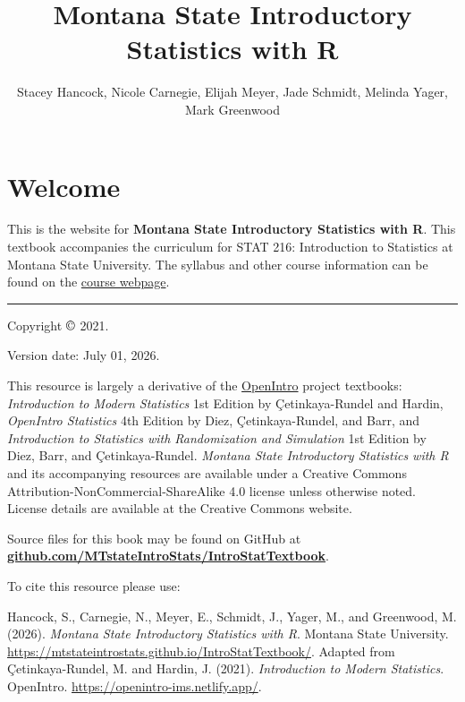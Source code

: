\documentclass[
  10pt,
  openany]{book}
\title{Montana State Introductory Statistics with R}
\author{Stacey Hancock, Nicole Carnegie, Elijah Meyer, Jade Schmidt, Melinda Yager, Mark Greenwood}
\date{}
\theoremstyle{definition}
\theoremstyle{definition}
\theoremstyle{definition}
\theoremstyle{definition}
\theoremstyle{remark}
\begin{document}
\maketitle

{
\setcounter{tocdepth}{1}
\tableofcontents
}
\chapter*{Welcome}\label{welcome}

This is the website for \textbf{Montana State Introductory Statistics with R}.
This textbook accompanies the curriculum for STAT 216: Introduction to Statistics at Montana State University. The syllabus and other course information can be found
on the \href{https://math.montana.edu/courses/s216/index.html}{course webpage}.

\begin{center}\rule{0.5\linewidth}{0.5pt}\end{center}

Copyright \(\copyright\) 2021.

Version date: July 01, 2026.

This resource is largely a derivative of the \href{https://www.openintro.org/}{OpenIntro} project textbooks: \emph{Introduction to Modern Statistics} 1st Edition by Çetinkaya-Rundel and Hardin, \emph{OpenIntro Statistics} 4th Edition by Diez, Çetinkaya-Rundel, and Barr, and \emph{Introduction to Statistics with Randomization and Simulation} 1st Edition by Diez, Barr, and Çetinkaya-Rundel.
\emph{Montana State Introductory Statistics with R} and its accompanying resources are available under a Creative Commons Attribution-NonCommercial-ShareAlike 4.0 license unless otherwise noted.
License details are available at the Creative Commons website.

Source files for this book may be found on GitHub at\\
\href{https://github.com/MTstateIntroStats/IntroStatTextbook}{\textbf{github.com/MTstateIntroStats/IntroStatTextbook}}.

To cite this resource please use:

Hancock, S., Carnegie, N., Meyer, E., Schmidt, J., Yager, M., and Greenwood, M. (2026). \emph{Montana State Introductory Statistics with R}. Montana State University. \url{https://mtstateintrostats.github.io/IntroStatTextbook/}. Adapted from Çetinkaya-Rundel, M. and Hardin, J. (2021). \emph{Introduction to Modern Statistics}. OpenIntro. \url{https://openintro-ims.netlify.app/}.
\end{document}
